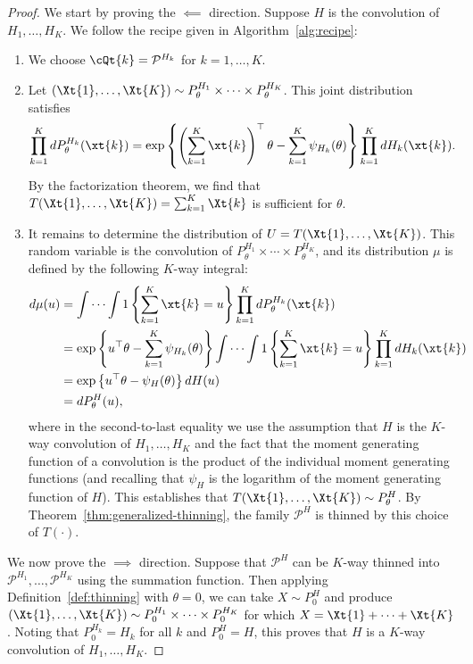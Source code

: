\documentclass[12pt]{article}
\begin{document}
\begin{proof}
We start by proving the $\impliedby$ direction.
Suppose $H$ is the convolution of $H_1,\ldots, H_K$.  We follow the recipe given in Algorithm~\ref{alg:recipe}:

\begin{enumerate}
    \item We choose $\cQt{k}=\mathcal P^{H_k}$ for $k=1,\ldots,K$.
    \item Let $(\Xt{1},\ldots,\Xt{K})\sim P^{H_1}_\theta\times \cdots\times P^{H_K}_\theta$.  This joint distribution satisfies
    $$
    \prod_{k=1}^KdP^{H_k}_\theta(\xt{k})=\exp\left\{\left(\sum_{k=1}^K\xt{k}\right)^\top\theta-\sum_{k=1}^K\psi_{H_k}(\theta)\right\}\prod_{k=1}^KdH_k(\xt{k}).
    $$
    By the factorization theorem, we find that $T(\Xt{1},\ldots,\Xt{K})=\sum_{k=1}^K\Xt{k}$ is sufficient for $\theta$.
    \item It remains to determine the distribution of $U=T(\Xt{1},\ldots,\Xt{K})$.  This random variable is the convolution of $P^{H_1}_\theta\times \cdots\times P^{H_K}_\theta$, and its distribution $\mu$ is defined by the following $K$-way integral:
    \begin{align*}
d\mu(u)&=\int\cdots\int1\left\{\sum_{k=1}^K\xt{k}=u\right\}\prod_{k=1}^KdP^{H_k}_\theta(\xt{k})\\
&=\exp\left\{u^\top\theta-\sum_{k=1}^K\psi_{H_k}(\theta)\right\}\int\cdots\int1\left\{\sum_{k=1}^K\xt{k}=u\right\}\prod_{k=1}^KdH_k(\xt{k})\\
&=\exp\left\{u^\top\theta-\psi_{H}(\theta)\right\}dH(u)\\
&=dP^H_\theta(u),
    \end{align*}
where in the second-to-last equality we use the assumption that $H$ is the $K$-way convolution of $H_1,\ldots,H_K$ and the fact that the moment generating function of a convolution is the product of the individual moment generating functions (and recalling that $\psi_H$ is the logarithm of the moment generating function of $H$). This establishes that $T(\Xt{1},\ldots,\Xt{K})\sim P^H_\theta$. By Theorem~\ref{thm:generalized-thinning}, the family $\mathcal P^H$ is thinned by this choice of $T(\cdot)$.
\end{enumerate}

We now prove the $\implies$ direction.
Suppose that $\mathcal P^H$ can be $K$-way thinned into $\mathcal P^{H_1},\ldots, \mathcal P^{H_K}$ using the summation function.  Then applying Definition~\ref{def:thinning} with $\theta=0$, we can take $X\sim P^{H}_0$ and produce $(\Xt{1},\ldots,\Xt{K})\sim P^{H_1}_0\times\cdots\times P^{H_K}_0$ for which $X=\Xt{1}+\cdots+\Xt{K}$.  Noting that $P^{H_k}_0=H_k$ for all $k$ and $P^{H}_0=H$, this proves that $H$ is a $K$-way convolution of $H_1,\ldots,H_K$. 
\end{proof}
\end{document}
